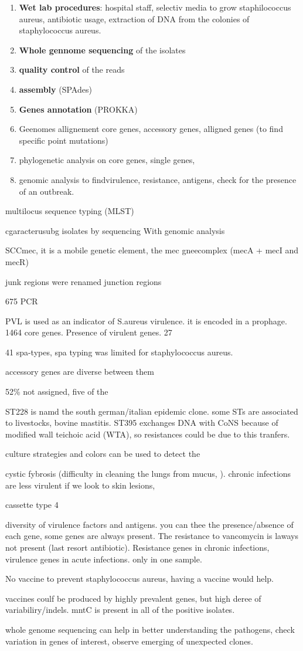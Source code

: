 \begin{enumerate}
	\item \textbf{Wet lab procedures}: hospital staff, selectiv media to grow staphilococcus aureus, antibiotic usage, extraction of DNA from the colonies of staphylococcus aureus. 
	\item \textbf{Whole gennome sequencing} of the isolates
	\item \textbf{quality control} of the reads
	\item \textbf{assembly} (SPAdes)
	\item \textbf{Genes annotation} (PROKKA)
	\item Geenomes allignement core genes, accessory genes, alligned genes (to find specific point mutations)
	\item phylogenetic analysis on core genes, single genes,
	\item genomic analysis to findvirulence, resistance, antigens, check for the presence of an outbreak.  
\end{enumerate}

multilocus sequence typing (MLST)

cgaracterusubg isolates by sequencing
With genomic analysis

SCCmec, it is a mobile genetic element, the mec gneecomplex (mecA + mecI and mecR)

junk regions were renamed junction regions


675 PCR

PVL is used as an indicator of S.aureus virulence. it is encoded in a prophage. 1464 core genes. Presence of virulent genes. 27%

41 spa-types, spa typing was limited for staphylococcus aureus. 

accessory genes are diverse between them

52\% not assigned, five of the 

ST228 is namd the south german/italian epidemic clone. 
some STs are associated to livestocks, bovine mastitis. 
ST395 exchanges DNA  with CoNS because of modified wall teichoic acid (WTA), so resistances could be due to this tranfers. 

culture strategies and colors can be used to detect the 

cystic fybrosis (difficulty in cleaning the lungs from mucus, ). chronic infections are less virulent
if we look to skin lesions, 

cassette type 4


diversity of virulence factors and antigens. you can thee the presence/absence of each gene, some genes are always present. The resistance to vancomycin is laways not present (last resort antibiotic). Resistance genes in chronic infections, virulence genes in acute infections. only in one sample.

No vaccine to prevent staphylococcus aureus, having a vaccine would help.

vaccines coulf be produced by highly prevalent genes, but high deree of variabiliry/indels. mntC is present in all of the positive isolates.  

whole genome sequencing can help in better understanding the pathogens, check variation in genes of interest, observe emerging of unexpected clones. 